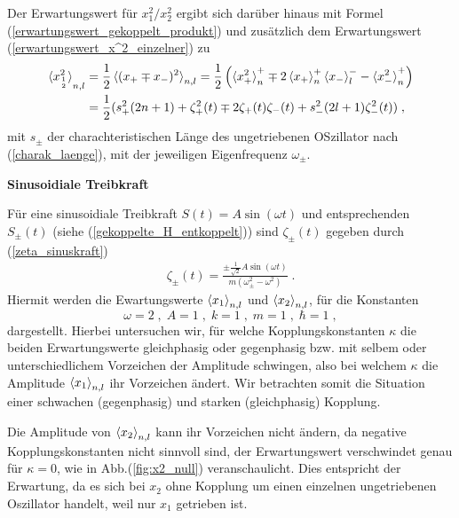     Der Erwartungswert für $x_{1}^2/x_2^2$ ergibt sich darüber hinaus mit Formel (\ref{erwartungswert_gekoppelt_produkt}) und zusätzlich dem Erwartungswert (\ref{erwartungswert_x^2_einzelner}) zu
    \begin{align}
      \braket{x_{1\atop 2}^2}_{n,l}&=\frac{1}{2}\braket{(x_+\mp x_-)^2}_{n,l}
      =\frac{1}{2}\left(\braket{x_+^2}_n^+ \mp 2\braket{x_+}_n^+\braket{x_-}_l^- - \braket{x_-^2}_n^+\right) \notag\\
      &=\frac 1 2 (s_+^2(2n+1)+\zeta_+^2(t) \mp 2\zeta_+(t)\zeta_-(t) + s_-^2(2l+1)\zeta_-^2(t)) \; ,
    \end{align}
    mit $s_\pm$ der charachteristischen Länge des ungetriebenen OSzillator nach (\ref{charak_laenge}), mit der jeweiligen Eigenfrequenz $\omega_\pm$.

    \textbf{Sinusoidiale Treibkraft}

    Für eine sinusoidiale Treibkraft $S(t)=A\sin(\omega t)$ und entsprechenden $S_\pm(t)$ (siehe (\ref{gekoppelte_H_entkoppelt})) sind $\zeta_\pm(t)$ gegeben durch (\ref{zeta_sinuskraft})
    \begin{align}
      \zeta_\pm(t) = \frac{\pm\frac{1}{\sqrt 2} A\sin(\omega t)}{m(\omega_\pm^2 - \omega^2)} \; .
    \end{align}
    Hiermit werden die Ewartungswerte $\braket{x_1}_{n,l}$ und $\braket{x_2}_{n,l}$, für die Konstanten
    \begin{equation}
      \omega=2 \;,\; A=1 \;,\; k=1 \;,\; m=1 \;,\; \hbar=1 \; ,
    \end{equation}
    dargestellt.
    Hierbei untersuchen wir, für welche Kopplungskonstanten $\kappa$ die beiden Erwartungswerte gleichphasig oder gegenphasig bzw. mit selbem oder unterschiedlichem Vorzeichen der Amplitude schwingen, also bei welchem $\kappa$ die Amplitude $\braket{x_1}_{n,l}$ ihr Vorzeichen ändert.
    Wir betrachten somit die Situation einer schwachen (gegenphasig) und starken (gleichphasig) Kopplung.

    Die Amplitude von $\braket{x_2}_{n,l}$ kann ihr Vorzeichen nicht ändern, da negative Kopplungskonstanten nicht sinnvoll sind, der Erwartungswert verschwindet genau für $\kappa=0$, wie in Abb.(\ref{fig:x2_null}) veranschaulicht.
    Dies entspricht der Erwartung, da es sich bei $x_2$ ohne Kopplung um einen einzelnen ungetriebenen Oszillator handelt, weil nur $x_1$ getrieben ist.

